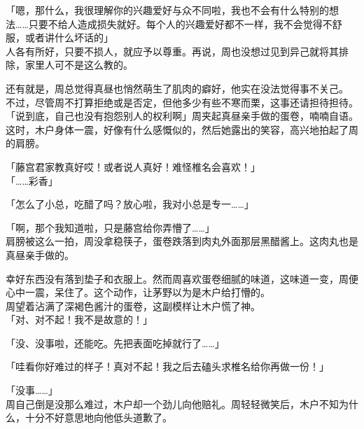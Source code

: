 「嗯，那什么，我很理解你的兴趣爱好与众不同啦，我也不会有什么特别的想法……只要不给人造成损失就好。每个人的兴趣爱好都不一样，我不会觉得不舒服，或者讲什么坏话的」\\

人各有所好，只要不损人，就应予以尊重。再说，周也没想过见到异己就将其排除，家里人可不是这么教的。

还有就是，周总觉得真昼也悄然萌生了肌肉的癖好，他实在没法觉得事不关己。\\

不过，尽管周不打算拒绝或是否定，但他多少有些不寒而栗，这事还请担待担待。\\

「说到底，自己也没有抱怨别人的权利啊」周夹起真昼亲手做的蛋卷，喃喃自语。这时，木户身体一震，好像有什么感慨似的，然后她露出的笑容，高兴地拍起了周的肩膀。

「藤宫君家教真好哎！或者说人真好！难怪椎名会喜欢！」\\

「……彩香」

「怎么了小总，吃醋了吗？放心啦，我对小总是专一……」

「啊，那个我知道啦，只是藤宫给你弄懵了……」\\

肩膀被这么一拍，周没拿稳筷子，蛋卷跌落到肉丸外面那层黑醋酱上。这肉丸也是真昼亲手做的。

幸好东西没有落到垫子和衣服上。然而周喜欢蛋卷细腻的味道，这味道一变，周便心中一震，呆住了。这个动作，让茅野以为是木户给打懵的。\\

周望着沾满了深褐色酱汁的蛋卷，这副模样让木户慌了神。\\

「对、对不起！我不是故意的！」

「没、没事啦，还能吃。先把表面吃掉就行了……」

「哇看你好难过的样子！真对不起！我之后去磕头求椎名给你再做一份！」

「没事……」\\

周自己倒是没那么难过，木户却一个劲儿向他赔礼。周轻轻微笑后，木户不知为什么，十分不好意思地向他低头道歉了。
